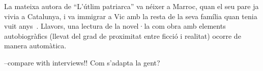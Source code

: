 La mateixa autora de ``L'útlim patriarca'' va néixer a Marroc, quan el seu pare ja vivia a Catalunya, i va immigrar a Vic amb la resta de la seva família quan tenia vuit anys~\autocite{Vidal2012}.
Llavors, una lectura de la novel·la com obra amb elements autobiogràfics (llevat del grad de proximitat entre ficció i realitat) ocorre de manera automàtica.



--compare with interviews!!
Com s'adapta la gent?


\begin{comment}

---------

Entrevistes: lectura autobiogràfica?

  http://www.belletrista.com/2011/Issue12/features_2.php
--> die Fragmente können vlt mit zum Patriarchat?

  --naming things!!!
  "N. By learning the language, by learning the words, and reading the dictionary, she starts to name what happens around her, and the first step to get out of an abusive situation is to know what's happening and have the ability to name it. So that's very important. If you think about therapy, when we go to therapy the only thing we do is name the things that are happening around us and inside us. So, if you don't have enough words to name the things, you are not able to be free. And literature is a way to see different lives—lives that can be deeper and end happily. "

  "We don't talk a lot about violence and sometimes there is something very dangerous about people that are violent, and that is the silence. Silence makes you part of this violence."

   N: Some of the things that happen around him justify what he does. I was very surprised when I was writing the book that women in the family were so important in making him become the monster he becomes.

   L. So their behavior allows him to become that way?

   N. Yes, and you can see that. His sisters seem to coddle and protect him, his mother a little less so, and less so as she gets older. I think that wasn't very helpful for him. It's something that's really shocking because they're women, but I've seen in that area of Morocco that sometimes you receive more compassion from men than from women. Or from the older women in the families because they are becoming more powerful as they get older. 


\end{comment}
